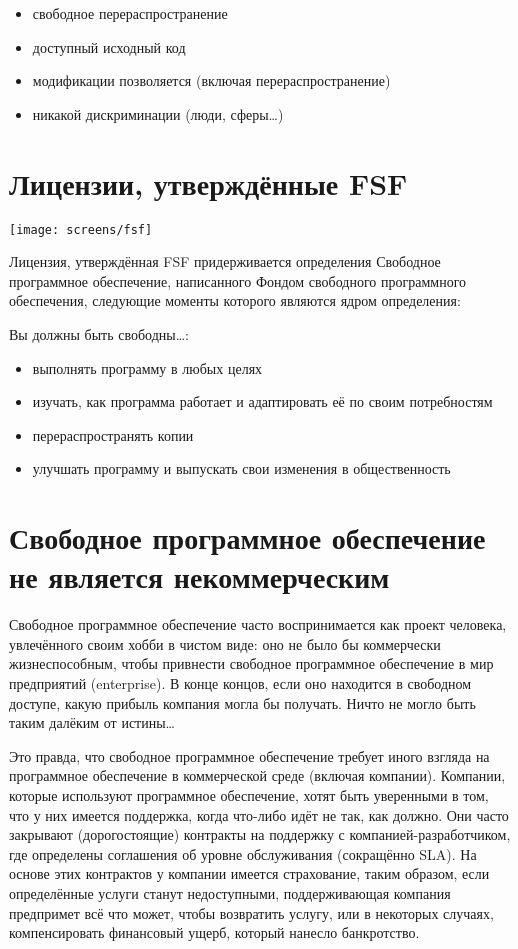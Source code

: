 \documentclass[12pt]{book}
\begin{document}
\begin{itemize}
	\item свободное перераспространение
	\item доступный исходный код
	\item модификации позволяется (включая перераспространение)
	\item никакой дискриминации (люди, сферы\ldots)
\end{itemize}

\section{Лицензии, утверждённые FSF}

\begin{center}\texttt{[image: screens/fsf]}\end{center}

\vspace{-4mm}

Лицензия, утверждённая FSF придерживается определения Свободное программное обеспечение, написанного Фондом свободного программного обеспечения, следующие моменты которого являются ядром определения:

Вы должны быть свободны\ldots:

\begin{itemize}
	\item выполнять программу в любых целях
	\item изучать, как программа работает и адаптировать её по своим потребностям
	\item перераспространять копии
	\item улучшать программу и выпускать свои изменения в общественность
\end{itemize}

\section{Свободное программное обеспечение не является некоммерческим}

Свободное программное обеспечение часто воспринимается как проект человека, увлечённого своим хобби в чистом виде: оно не было бы коммерчески жизнеспособным, чтобы привнести свободное программное обеспечение в мир предприятий (enterprise). В конце концов, если оно находится в свободном доступе, какую прибыль компания могла бы получать. Ничто не могло быть таким далёким от истины\ldots

Это правда, что свободное программное обеспечение требует иного взгляда на программное обеспечение в коммерческой среде (включая компании). Компании, которые используют программное обеспечение, хотят быть уверенными в том, что у них имеется поддержка, когда что-либо идёт не так, как должно. Они часто закрывают (дорогостоящие) контракты на поддержку с компанией-разработ\-чиком, где определены соглашения об уровне обслуживания (сокращённо SLA). На основе этих контрактов у компании имеется страхование, таким образом, если определённые услуги станут недоступными, поддерживающая компания предпримет всё что может, чтобы возвратить услугу, или в некоторых случаях, компенсировать финансовый ущерб, который нанесло банкротство.
\end{document}
